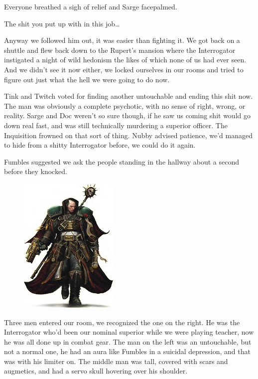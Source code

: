 Everyone breathed a sigh of relief and Sarge facepalmed.

The shit you put up with in this job…

Anyway we followed him out, it was easier than fighting it. 
We got back on a shuttle and flew back down to the Rupert's mansion where the Interrogator instigated a night of wild hedonism the likes of which none of us had ever seen. 
And we didn't see it now either, we locked ourselves in our rooms and tried to figure out just what the hell we were going to do now.

Tink and Twitch voted for finding another untouchable and ending this shit now. 
The man was obviously a complete psychotic, with no sense of right, wrong, or reality. 
Sarge and Doc weren't so sure though, if he saw us coming shit would go down real fast, and was still technically murdering a superior officer. 
The Inquisition frowned on that sort of thing. 
Nubby advised patience, we'd managed to hide from a shitty Interrogator before, we could do it again.

Fumbles suggested we ask the people standing in the hallway about a second before they knocked.

\begin{figure}
	\begin{center}
		\includegraphics[width=\figwidth]{pics/9/59.png}
	\end{center}
\end{figure}
Three men entered our room, we recognized the one on the right. 
He was the Interrogator who'd been our nominal superior while we were playing teacher, now he was all done up in combat gear. 
The man on the left was an untouchable, but not a normal one, he had an aura like Fumbles in a suicidal depression, and that was with his limiter on. 
The middle man was tall, covered with scars and augmetics, and had a servo skull hovering over his shoulder.

